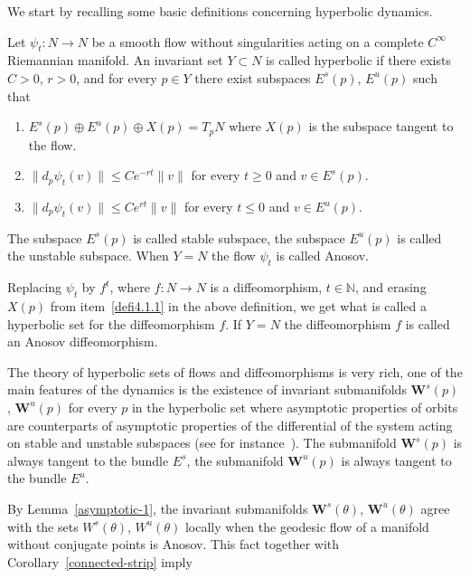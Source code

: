 \documentclass[AHL,Unicode,longabstracts,published]{cedram}
\newcommand{\bfW}{\mathbf{W}}
\newcommand{\bbN}{\mathbb{N}}
\begin{document}
We start by recalling some basic definitions concerning hyperbolic dynamics.

\begin{defi}\label{hyperbolic1}
Let $\psi_{t}: N\longrightarrow N$ be a smooth flow without singularities acting on a complete $C^{\infty}$ Riemannian manifold. An invariant set $Y \subset N$ is called hyperbolic if there exists $C>0$, $r>0$, and for every $ p \in Y$ there exist subspaces $E^{s}(p)$, $E^{u}(p)$ such that
\begin{enumerate}
\item \label{defi4.1.1}$E^{s}(p) \oplus E^{u}(p) \oplus X(p) = T_{p}N$ where $X(p)$ is the subspace tangent to the flow.
\item \label{defi4.1.2}$\parallel d_{p}\psi_{t}(v) \parallel \leq Ce^{-rt} \parallel v \parallel $ for every $t \geq 0$ and $v \in E^{s}(p)$.
\item \label{defi4.1.3}$\parallel d_{p}\psi_{t}(v) \parallel \leq Ce^{rt} \parallel v \parallel $ for every $t \leq 0$ and $v \in E^{u}(p)$.
\end{enumerate}

The subspace $E^{s}(p)$ is called stable subspace, the subspace $E^{u}(p)$ is called the unstable subspace. When $Y = N$ the flow $\psi_{t}$ is called Anosov.

Replacing $\psi_{t}$ by $f^{t}$, where $f:N \longrightarrow N$ is a diffeomorphism, $t \in \bbN$, and erasing $X(p)$ from item~\eqref{defi4.1.1} in the above definition, we get what is called a hyperbolic set for the diffeomorphism $f$. If $Y=N$ the diffeomorphism $f$ is called an Anosov diffeomorphism.
\end{defi}

The theory of hyperbolic sets of flows and diffeomorphisms is very rich, one of the main features of the dynamics is the existence of invariant submanifolds $\bfW^{s}(p)$, $\bfW^{u}(p)$ for every $p$ in the hyperbolic set where asymptotic properties of orbits are counterparts of asymptotic properties of the differential of the system acting on stable and unstable subspaces (see for instance~\cite{kn:Anosov,kn:HPS}). The submanifold $\bfW^{s}(p)$ is always tangent to the bundle $E^{s}$, the submanifold $\bfW^{u}(p)$ is always tangent to the bundle $E^{u}$.

By Lemma~\ref{asymptotic-1}, the invariant submanifolds $\bfW^{s}(\theta)$, $\bfW^{u}(\theta)$ agree with the sets $W^{s}(\theta)$, $W^{u}(\theta)$ locally when the geodesic flow of a manifold without conjugate points is Anosov. This fact together with Corollary~\ref{connected-strip} imply
\end{document}
